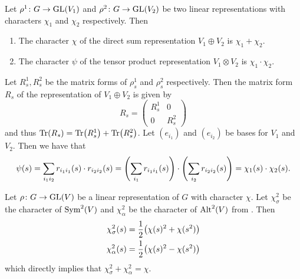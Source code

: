 \documentclass[letterpaper, 11pt, oneside]{book}
\begin{document}
\begin{prop}
  Let $\rho^{1}\colon G \to \operatorname{GL}(V_{1})$ and $\rho^{2}\colon G \to \operatorname{GL}(V_{2})$ be two linear representations with characters $\chi_{1}$ and $\chi_{2}$ respectively.
  Then
  \begin{enumerate}
  \item The character $\chi$ of the direct sum representation $V_{1} \oplus V_{2}$ is $\chi_{1} + \chi_{2}$.
  \item The character $\psi$ of the tensor product representation $V_{1} \otimes V_{2}$ is $\chi_{1} \cdot \chi_{2}$.
  \end{enumerate}
\end{prop}
\begin{pf}
  Let $R_{s}^{1}, R_{s}^{2}$ be the matrix forms of $\rho^{1}_{s}$ and $\rho_{s}^{2}$ respectively.
  Then the matrix form $R_{s}$ of the representation of $V_{1} \oplus V_{2}$ is given by
  \[
    R_{s} = \begin{pmatrix} R_{s}^{1} & 0 \\  0& R_{s}^{2} \end{pmatrix}
  \]
  and thus $\Tr(R_{s}) = \Tr(R_{s}^{1}) + \Tr(R_{s}^{2})$.
  Let $(e_{i_{1}})$ and $(e_{i_{2}})$ be bases for $V_{1}$ and $V_{2}$.
  Then we have that
  \[
    \psi(s) = \sum_{i_{1} i_{2}} r_{i_{1}i_{1}}(s) \cdot r_{i_{2}i_{2}}(s) = \pqty{\sum_{i_{1}} r_{i_{1}i_{1}}(s)} \cdot \pqty{\sum_{i_{2}} r_{i_{2}i_{2}}(s)} = \chi_{1}(s) \cdot \chi_{2}(s).
  \]
\end{pf}

\begin{prop}\label{prop:sym_alt_characters}
  Let $\rho\colon G \to \operatorname{GL}(V)$ be a linear representation of $G$ with character $\chi$.
  Let $\chi_{\sigma}^{2}$ be the character of $\operatorname{Sym}^{2}(V)$ and $\chi_{\alpha}^{2}$ be the character of $\operatorname{Alt}^{2}(V)$ from .
  Then
  \begin{align*}
    \chi_{\sigma}^{2}(s) &= \frac{1}{2}\pqty{\chi(s)^{2} + \chi(s^{2})} \\
    \chi_{\alpha}^{2}(s) &= \frac{1}{2}\pqty{\chi(s)^{2} - \chi(s^{2})}
  \end{align*}
  which directly implies that $\chi_{\sigma}^{2} + \chi_{\alpha}^{2} = \chi$.
\end{prop}
\end{document}
